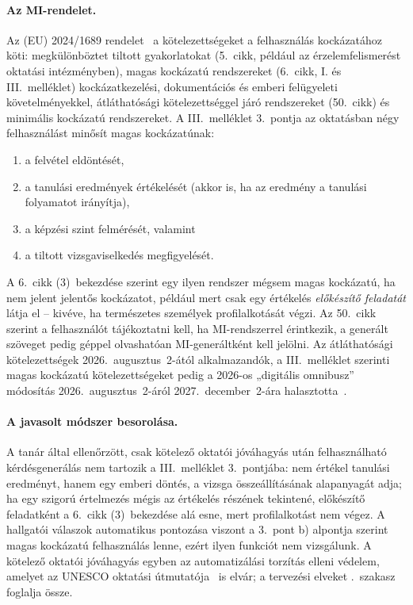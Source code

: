 \paragraph{Az MI-rendelet.} Az (EU) 2024/1689 rendelet~\cite{aiact2024} a kötelezettségeket a felhasználás
kockázatához köti: megkülönböztet tiltott gyakorlatokat (5.~cikk, például az érzelemfelismerést oktatási
intézményben), magas kockázatú rendszereket (6.~cikk, I. és III.~melléklet) kockázatkezelési,
dokumentációs és emberi felügyeleti követelményekkel, átláthatósági kötelezettséggel járó rendszereket
(50.~cikk) és minimális kockázatú rendszereket. A III.~melléklet 3.~pontja az oktatásban négy felhasználást
minősít magas kockázatúnak:
\begin{enumerate}[label=(\arabic*),leftmargin=*,itemsep=1pt,topsep=2pt]
\item a felvétel eldöntését,
\item a tanulási eredmények értékelését (akkor is, ha az eredmény a tanulási folyamatot irányítja),
\item a képzési szint felmérését, valamint
\item a tiltott vizsgaviselkedés megfigyelését.
\end{enumerate}
A 6.~cikk (3)~bekezdése szerint egy ilyen rendszer mégsem magas kockázatú, ha nem jelent
jelentős kockázatot, például mert csak egy értékelés \emph{előkészítő feladatát} látja el -- kivéve, ha
természetes személyek profilalkotását végzi. Az 50.~cikk szerint a felhasználót tájékoztatni kell, ha
MI-rendszerrel érintkezik, a generált szöveget pedig géppel olvashatóan MI-generáltként kell jelölni. Az
átláthatósági kötelezettségek 2026.~augusztus~2-ától alkalmazandók, a III.~melléklet szerinti magas
kockázatú kötelezettségeket pedig a 2026-os „digitális omnibusz” módosítás 2026.~augusztus~2-áról
2027.~december~2-ára halasztotta~\cite{omnibus2026}.

\paragraph{A javasolt módszer besorolása.} A tanár által ellenőrzött, csak kötelező oktatói jóváhagyás után
felhasználható kérdésgenerálás nem tartozik a III.~melléklet 3.~pontjába: nem értékel tanulási eredményt,
hanem egy emberi döntés, a vizsga összeállításának alapanyagát adja; ha egy szigorú értelmezés mégis az
értékelés részének tekintené, előkészítő feladatként a 6.~cikk (3)~bekezdése alá esne, mert profilalkotást
nem végez. A hallgatói válaszok automatikus pontozása viszont a 3.~pont b) alpontja szerint magas
kockázatú felhasználás lenne, ezért ilyen funkciót nem vizsgálunk. A kötelező oktatói jóváhagyás egyben az
automatizálási torzítás elleni védelem, amelyet az UNESCO oktatási útmutatója~\cite{unesco2023guidance} is
elvár; a tervezési elveket \az{\ref{sec:architektura}}.~szakasz foglalja össze.

